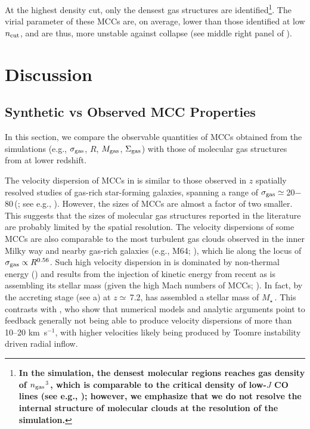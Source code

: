 \IfFileExists{emulateapjlegacy.cls}{\documentclass[iop]{emulateapjlegacy}}{\documentclass[iop]{emulateapj}}
\begin{document}
At the highest density cut, only the densest gas structures are identified\footnote{\bf{In the simulation, the 
densest molecular regions reaches gas density of $n_{\rm gas}$$^3$\,\cc, which is comparable to the critical density 
of low-$J$ CO lines (see e.g., \citealt{Vallini18a}); however, we emphasize that we do not resolve the internal structure of molecular clouds
at the resolution of the simulation.}}. The virial parameter of these MCCs are, on average, lower than those identified at low $n_{\rm cut}$, and are thus, more unstable against collapse (see middle right panel of ).


\section{Discussion}\label{sec:diss}

\subsection{Synthetic vs Observed MCC Properties} \label{sec:diss1}

In this section, we compare the observable quantities of MCCs obtained from the simulations (e.g., $\sigma_{\rm gas}$, $R$, $M_{\rm gas}$, $\Sigma_{\rm gas}$) with those of molecular gas structures from \obs at lower redshift.

The velocity dispersion of MCCs in \flower is similar to those observed in $z$ spatially resolved studies of gas-rich star-forming galaxies,
spanning a range of $\sigma_{\rm gas}\simeq$\,20$-$80\,\kms (; see e.g., \citealt{Swinbank11a}).
However, the sizes of MCCs are almost a factor of two smaller. This suggests that the sizes of \highz molecular gas structures reported in the literature
are probably limited by the spatial resolution.
The velocity dispersions of some MCCs are also comparable to the most turbulent gas clouds observed in the inner Milky way and nearby gas-rich galaxies (e.g., M64; \citealt{Oka01a, Rosolowsky05a, Heyer09a, Leroy15a}), which lie along the locus of $\sigma_{\rm gas}\propto R^{0.56}$. Such high velocity dispersion in \flower is dominated by non-thermal energy () and results from the injection of kinetic energy from recent \SF as \flower is assembling its stellar mass (given the high Mach numbers of MCCs; ). In fact, by the accreting stage (see a) at $z\simeq$\,7.2, \flower has assembled a stellar mass of $M_\star$\,\Msun.
% 
This contrasts with \citet{Krumholz18a}, who show that numerical models and analytic arguments point to feedback generally not being able to produce velocity dispersions of more than 10--20 km~s$^{-1}$, with higher velocities likely being produced by Toomre instability driven radial inflow.
\end{document}
